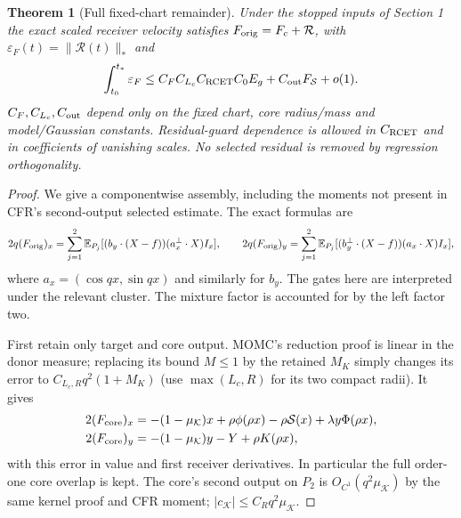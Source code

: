 \documentclass[11pt]{article}
\newtheorem{theorem}{Theorem}[section]
\theoremstyle{remark}\newtheorem{remark}[theorem]{Remark}
\newcommand{\E}{\mathbb E}
\newcommand{\KK}{\mathcal K}
\newcommand{\eps}{\varepsilon}
\begin{document}
\begin{theorem}[Full fixed-chart remainder]
\label{an03cfav1:assembly}
Under the stopped inputs of Section 1 the exact scaled
receiver velocity satisfies
$F_{\rm orig}=F_c+\mathcal R$, with
$\eps_F(t)=\|\mathcal R(t)\|_*$ and
\begin{equation}
 \int_{t_0}^{t_*}\eps_F
 \le C_F C_{L_c}C_{\rm RCET}C_0E_g
                    +C_{\rm out}F_{\mathcal S}+o(1).
 \label{an03cfav1:fullbudget}
\end{equation}
$C_F,C_{L_c},C_{\rm out}$ depend only on the fixed chart,
core radius/mass and model/Gaussian constants.
Residual-guard dependence is allowed in $C_{\rm RCET}$ and
in coefficients of vanishing scales. No selected residual
is removed by regression orthogonality.
\end{theorem}
\begin{proof}
We give a componentwise assembly, including the moments
not present in CFR's second-output selected estimate.
The exact formulas are
\[
 2q(F_{\rm orig})_x
 =\sum_{j=1}^2\E_{P_j}[(b_y\cdot(X-f))
                    (a_x^\perp\cdot X)I_x],\qquad
 2q(F_{\rm orig})_y
 =\sum_{j=1}^2\E_{P_j}[(b_y^\perp\cdot(X-f))(a_x\cdot X)I_x],
\]
where $a_x=(\cos qx,\sin qx)$ and similarly for $b_y$.
The gates here are interpreted under the relevant cluster.
The mixture factor is accounted for by the left factor two.

First retain only target and core output. MOMC's reduction
proof is linear in the donor measure; replacing its bound
$M\le1$ by the retained $M_K$ simply changes its error to
$C_{L_c,R}q^2(1+M_K)$ (use $\max(L_c,R)$ for its two compact
radii). It gives
\[
 \begin{split}
 2(F_{\rm core})_x&=-(1-\mu_{\KK})x+\rho\phi(\rho x)
              -\rho\mathcal S(x)+\lambda y\Phi(\rho x),\\
 2(F_{\rm core})_y&=-(1-\mu_{\KK})y-Y+\rho K(\rho x),
 \end{split}
\]
with this error in value and first receiver derivatives.
In particular the full order-one core overlap is kept.
The core's second output on $P_2$ is
$O_{C^1}(q^2\mu_{\KK})$ by the same kernel proof and CFR
moment; $|c_{\KK}|\le C_Rq^2\mu_{\KK}$.


\end{proof}
\end{document}
